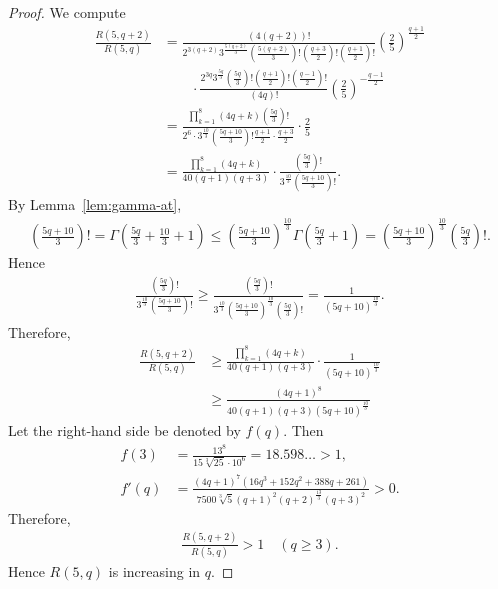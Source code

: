 \documentclass[12pt,reqno]{amsart}
\newcommand{\HL}{\vspace{2mm}}							%
\newcommand{\q}{\quad}									%
\newcommand{\f}[2]{\frac{#1}{#2}}							%
\theoremstyle{mythmstyle}
\theoremstyle{mydefstyle}
\newcommand{\lemref}[1]{Lemma~\ref{#1}}
\numberwithin{equation}{section}
\begin{document}
\begin{proof}
\item[\ref{itm:R5q}] We compute
\begin{align}
\f{R(5,q+2)}{R(5,q)} &= \f{(4(q+2))!}{2^{3(q+2)}3^{\f{5(q+2)}{3}}\left(\f{5(q+2)}{3}\right)!\left(\f{q+3}{2}\right)!\left(\f{q+1}{2}\right)!}\left(\f{2}{5}\right)^{\f{q+1}{2}} \\
&\qquad \cdot \f{2^{3q}3^{\f{5q}{3}}\left(\f{5q}{3}\right)!\left(\f{q+1}{2}\right)!\left(\f{q-1}{2}\right)!}{(4q)!}\left(\f{2}{5}\right)^{-\f{q-1}{2}} \\
&= \f{\prod_{k=1}^{8}(4q+k)\left(\f{5q}{3}\right)!}{2^{6}\cdot 3^{\f{10}{3}}\left(\f{5q+10}{3}\right)!\f{q+1}{2}\cdot\f{q+3}{2}}\cdot \f{2}{5} \\
&= \f{\prod_{k=1}^{8}(4q+k)}{40(q+1)(q+3)}\cdot \f{\left(\f{5q}{3}\right)!}{3^{\f{10}{3}}\left(\f{5q+10}{3}\right)!}.
\end{align}
By \lemref{lem:gamma-at},
\begin{align}
\left(\f{5q+10}{3}\right)! = \Gamma\left(\f{5q}{3}+\f{10}{3}+1\right) \le \left(\f{5q+10}{3}\right)^{\f{10}{3}}\Gamma\left(\f{5q}{3}+1\right)
= \left(\f{5q+10}{3}\right)^{\f{10}{3}}\left(\f{5q}{3}\right)!.
\end{align}
Hence
\begin{align}
\f{\left(\f{5q}{3}\right)!}{3^{\f{10}{3}}\left(\f{5q+10}{3}\right)!} \ge \f{\left(\f{5q}{3}\right)!}{3^{\f{10}{3}}\left(\f{5q+10}{3}\right)^{\f{10}{3}}\left(\f{5q}{3}\right)!}
= \f{1}{(5q+10)^{\f{10}{3}}}.
\end{align}
Therefore,
\begin{align}
\f{R(5,q+2)}{R(5,q)} &\ge \f{\prod_{k=1}^{8}(4q+k)}{40(q+1)(q+3)}\cdot \f{1}{(5q+10)^{\f{10}{3}}} \\
&\ge \f{(4q+1)^{8}}{40(q+1)(q+3)(5q+10)^{\f{10}{3}}}
\end{align}
Let the right-hand side be denoted by $f(q)$. Then
\begin{align}
f(3) &= \f{13^{8}}{15\sqrt[3]{25}\cdot 10^{6}} = 18.598\ldots > 1, \\
f'(q) &= \f{(4q+1)^{7}(16q^{3}+152q^{2}+388q+261)}{7500\sqrt[3]{5}(q+1)^{2} (q+2)^{\f{13}{3}} (q+3)^{2}} > 0.
\end{align}
Therefore,
\begin{align}
\f{R(5,q+2)}{R(5,q)} > 1 \q (q \ge 3).
\end{align}
Hence $R(5,q)$ is increasing in $q$.
\HL


\end{proof}
\end{document}
